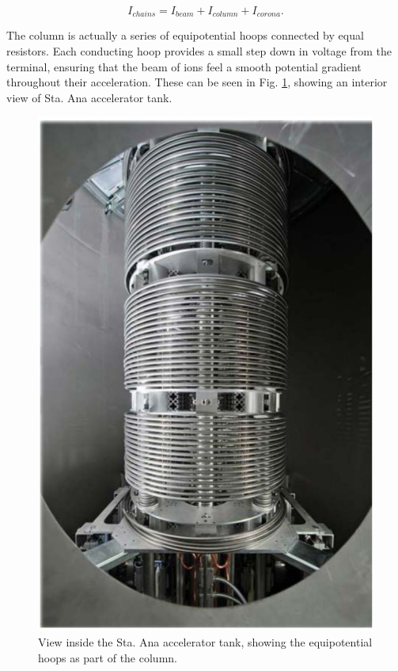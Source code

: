 \begin{equation}
I_{chains} = I_{beam} + I_{column} + I_{corona}.
\end{equation}

\noindent The column is actually a series of equipotential hoops connected by equal resistors. Each conducting hoop provides a small step down in voltage from the terminal, ensuring that the beam of ions feel a smooth potential gradient throughout their acceleration. These can be seen in Fig. \ref{fig: column}, showing an interior view of Sta. Ana accelerator tank. 


\begin{figure}
\centering
\includegraphics[width=0.5\linewidth]{figures/inside5U.png}
\caption{View inside the Sta. Ana accelerator tank, showing the equipotential hoops as part of the column.}
\label{fig: column}
\end{figure}


